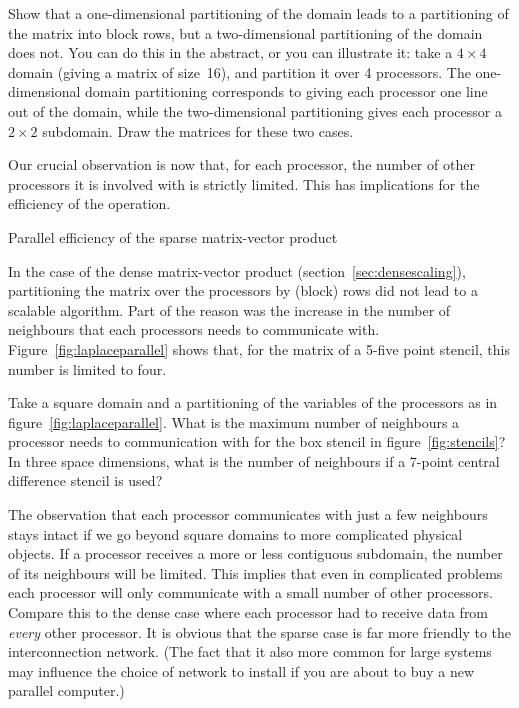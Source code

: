 \begin{exercise}
  Show that a one-dimensional partitioning of the domain leads to a
  partitioning of the matrix into block rows, but a two-dimensional
  partitioning of the domain does not. You can do this in the
  abstract, or you can illustrate it: take a $4\times4$ domain (giving
  a matrix of size~16), and partition it over 4 processors. The
  one-dimensional domain partitioning corresponds to giving each
  processor one line out of the domain, while the two-dimensional
  partitioning gives each processor a $2\times2$ subdomain. Draw the
  matrices for these two cases.
\end{exercise}

Our crucial observation is now that, for each processor, the number of
other processors it is involved with is strictly limited. This has
implications for the efficiency of the operation.

 {Parallel efficiency of the sparse matrix-vector product}
\label{sec:par-spmvp}

In the case of the dense matrix-vector product
(section~\ref{sec:densescaling}), partitioning the matrix over the
processors by (block) rows did not lead to a scalable algorithm. Part
of the reason was the increase in the number of neighbours that each
processors needs to communicate with. Figure~\ref{fig:laplaceparallel}
shows that, for the matrix of a 5-five point stencil, this number is
limited to four.

\begin{exercise}
  Take a square domain and a partitioning of the variables of the
  processors as in figure~\ref{fig:laplaceparallel}.
  What is the maximum number of neighbours a
  processor needs to communication with for the box stencil in
  figure~\ref{fig:stencils}? In three space dimensions, what is the
  number of neighbours if a 7-point central difference stencil is
  used?
\end{exercise}

The observation that each processor communicates with just a few
neighbours stays intact if we go beyond square domains to more
complicated physical objects. If a processor receives a more or less
contiguous subdomain, the number of its neighbours will be
limited. This implies that even in complicated problems each processor
will only communicate with a small number of other processors. Compare
this to the dense case where each processor had to receive data from
\emph{every} other processor. It is obvious that the sparse case is
far more friendly to the interconnection network. (The fact that it
also more common for large systems may influence the choice of network
to install if you are about to buy a new parallel computer.)

